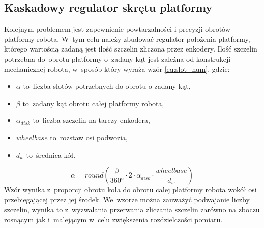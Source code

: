 \documentclass[11pt]{article}
\begin{document}
\subsection{Kaskadowy regulator skrętu platformy} \label{sec:reg_casc}
Kolejnym problemem jest zapewnienie powtarzalności i precyzji obrotów platformy robota.
W~tym celu należy zbudować regulator położenia platformy, którego wartością zadaną jest ilość szczelin zliczona przez enkodery.
Ilość szczelin potrzebna do~obrotu platformy o~zadany kąt jest zależna od konstrukcji mechanicznej robota, w~sposób który wyraża wzór \ref{eq:slot_num}, gdzie:
\begin{itemize}
	\item $ \alpha $ to~liczba slotów potrzebnych do obrotu o zadany kąt,
	\item $ \beta $ to~zadany kąt obrotu całej platformy robota,
	\item $ \alpha_{disk} $ to~liczba szczelin na tarczy enkodera,
	\item $ wheelbase $ to~rozstaw osi podwozia,
	\item $ d_w $ to~średnica kół.
\end{itemize}

\begin{equation}
	\label{eq:slot_num}
	\alpha = round \left( \frac{\beta}{ \ang{360}} \cdot 2 \cdot \alpha_{disk} \cdot \frac{wheelbase}{d_w} \right)
\end{equation}
Wzór wynika z~proporcji obrotu koła do obrotu całej platformy robota wokół osi przebiegającej przez jej środek.
We~wzorze można zauważyć podwajanie liczby szczelin, wynika to z~wyzwalania przerwania zliczania szczelin zarówno na zboczu rosnącym jak i~malejącym w~celu zwiększenia rozdzielczości pomiaru.
\end{document}
